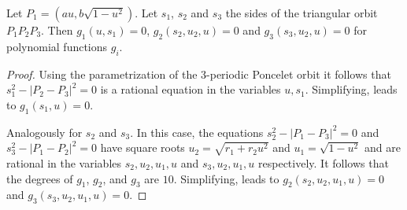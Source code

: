 	
	


\begin{lemma}
\label{lem:2sides} Let $P_1=(a u,b\sqrt{1-u^2}).$ Let $s_1$, $s_2$ and $s_3$ the sides of the triangular orbit ${P_1}{P_2}{P_3}$. Then $g_1(u,s_1)=0$, $g_2(s_2,u_2,u)=0$ and $g_3(s_3,u_2,u)=0$ for polynomial functions $g_i$.  
\end{lemma}
	
\begin{proof}
Using the parametrization of the 3-periodic Poncelet orbit it follows that $s_1^2-|P_2-P_3|^2=0$ is a rational equation in the variables $u,s_1$. Simplifying, leads to $g_1(s_1,u)=0.$

Analogously for $s_2$ and $s_3$. In this case, the equations $s_2^2-|P_1-P_3|^2=0$ and  $s_3^2-|P_1-P_2|^2=0$   have   square roots $u_2=\sqrt{r_1+r_2 u^2}$ and $u_1=\sqrt{1-u^2}$ and  are rational in the variables $s_2,u_2,u_1,u$ and $s_3,u_2,u_1,u$ respectively. It follows that the degrees of $g_1$, $g_2$, and $g_3$ are $10$.  Simplifying, leads to $g_2(s_2,u_2,u_1,u)=0 $ and $g_3(s_3,u_2,u_1,u)=0$. 
\end{proof}

